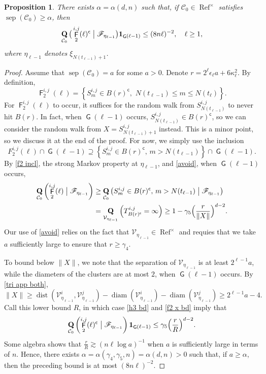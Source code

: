 \documentclass[11pt,reqno]{amsart}
\newtheorem{proposition}[lemma]{Proposition}
\theoremstyle{definition}
\numberwithin{equation}{section}
\newcommand{\1}{\mathbf{1}}
\newcommand{\eps}{\epsilon}
\DeclareMathOperator{\dist}{dist}
\DeclareMathOperator{\diam}{diam}
\DeclareMathOperator{\QQ}{\mathbf{Q}}
\DeclareMathOperator{\PPprod}{\mathbf{Q}}
\DeclareMathOperator{\sep}{sep}
\DeclareMathOperator{\Refcon}{\mathrm{Ref}}
\newcommand{\cc}{\mathsf{c}}
\DeclareMathOperator{\GG}{\mathsf{G}}
\DeclareMathOperator{\FF}{\mathsf{F}}
\newcommand{\CC}{\mathcal{C}}
\newcommand{\VV}{\mathcal{V}}
\newcommand{\scr}{\mathscr}
\begin{document}
\begin{proposition}\label{h3}
There exists $\alpha = \alpha (d,n)$ such that, if $\CC_0 \in \Refcon^\times$ satisfies $\sep (\CC_0) \geq \alpha$, then
\begin{equation*}
\PPprod_{\CC_0} \big( \FF_2^{i,j} (\ell)^\cc \bigm\vert \mathscr{F}_{\eta_{\ell-1}} \big) \1_{\GG (\ell-1)} \leq (8n\ell)^{-2}, \quad \ell \geq 1,
\end{equation*}
where $\eta_{\ell-1}$ denotes $\xi_{N(t_{\ell-1})+1}$.
\end{proposition}

\begin{proof}
Assume that $\sep (\CC_0) = a $ for some $a > 0$. Denote $r = 2^\ell \eps_\ell a + 6 \kappa_\ell^2$. By definition,
\[
\FF_2^{i,j} (\ell) = \left\{S_m^{i,j} \in B(r)^\cc, \,\, N(t_{\ell-1}) \leq m \leq N (t_\ell) \right\}.
\]
For $\FF_2^{i,j} (\ell)$ to occur, it suffices for the random walk from $S^{i,j}_{N(t_{\ell-1})}$ to never hit $B(r)$. In fact, when $\GG (\ell-1)$ occurs, $S^{i,j}_{N(t_{\ell-1})} \in B(r)^\cc$, so we can consider the random walk from $X = S^{i,j}_{N(t_{\ell-1})+1}$ instead. This is a minor point, so we discuss it at the end of the proof. For now, we simply use the inclusion  
\begin{equation}\label{f2 incl}
F_2^{i,j} (\ell) \cap \GG(\ell-1) \supseteq \left\{ S_m^{i,j} \in B(r)^\cc, \,m > N(t_{\ell-1})\right\} \cap \GG(\ell-1).
\end{equation}
By \eqref{f2 incl}, the strong Markov property at $\eta_{\ell-1}$, and \eqref{avoid}, when $\GG (\ell-1)$ occurs, 
\begin{align}
\QQ_{\CC_0} \left( \FF_2^{i,j} (\ell) \bigm\vert \scr{F}_{\eta_{\ell-1}} \right) 
&\geq \QQ_{\CC_0} \left( S_m^{i,j} \in B(r)^\cc, \,m > N(t_{\ell-1}) \bigm\vert \scr{F}_{\eta_{\ell-1}} \right) \nonumber\\ 
&= \QQ_{\VV_{\eta_{\ell-1}}} \left( T_{B(r)^\cc}^{i,j} = \infty \right) \geq 1 - \gamma_5 \Big( \frac{r}{\|X\|} \Big)^{d-2}. \label{h3 bd}
\end{align}
Our use of \eqref{avoid} relies on the fact that $\VV_{\eta_{\ell-1}} \in \Refcon^\times$ and requies that we take $a$ sufficiently large to ensure that $r \geq \gamma_4$.

To bound below $\|X\|$, we note that the separation of $\VV_{\eta_{\ell-1}}$ is at least $2^{\ell-1} a$, while the diameters of the clusters are at most $2$, when $\GG (\ell-1)$ occurs. By \eqref{tri app both},
\begin{equation}\label{f2 x bd}
\| X \| \geq \dist (\VV_{\eta_{\ell-1}}^i,\VV_{\eta_{\ell-1}}^j) - \diam (\VV_{\eta_{\ell-1}}^i) - \diam (\VV_{\eta_{\ell-1}}^j) \geq 2^{\ell-1} a - 4.
\end{equation}
Call this lower bound $R$, in which case \eqref{h3 bd} and \eqref{f2 x bd} imply that
\[
\QQ_{\CC_0} \left( \FF_2^{i,j} (\ell)^\cc \bigm\vert \scr{F}_{\eta_{\ell-1}} \right) \1_{\GG(\ell-1)}
\leq \gamma_5 \Big( \frac{r}{R} \Big)^{d-2}.
\]
Some algebra shows that $\frac{r}{R} \gtrsim (n \ell \log a)^{-1}$ when $a$ is sufficiently large in terms of $n$. Hence, there exists $\alpha = \alpha (\gamma_4,\gamma_5,n) = \alpha (d,n) > 0$ such that, if $a \geq \alpha$, then the preceding bound is at most $(8n\ell)^{-2}$.


\end{proof}
\end{document}
